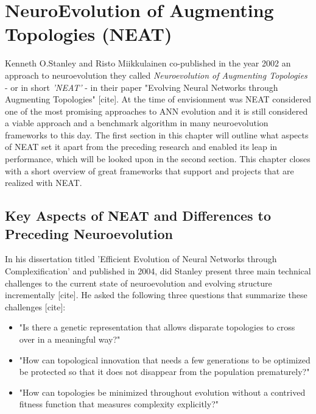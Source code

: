 \documentclass[journal, a4paper]{IEEEtran}
\begin{document}

\section{NeuroEvolution of Augmenting Topologies (NEAT)} \label{sec:neat}

Kenneth O.Stanley and Risto Miikkulainen co-published in the year 2002 an approach to neuroevolution they called \textit{Neuroevolution of Augmenting Topologies} - or in short \textit{'NEAT'} - in their paper "Evolving Neural Networks through Augmenting Topologies" [cite]. At the time of envisionment was NEAT considered one of the most promising approaches to ANN evolution and it is still considered a viable approach and a benchmark algorithm in many neuroevolution frameworks to this day. The first section in this chapter will outline what aspects of NEAT set it apart from the preceding research and enabled its leap in performance, which will be looked upon in the second section. This chapter closes with a short overview of great frameworks that support and projects that are realized with NEAT.



\subsection{Key Aspects of NEAT and Differences to Preceding Neuroevolution}

In his dissertation titled 'Efficient Evolution of Neural Networks through Complexification' and published in 2004, did Stanley present three main technical challenges to the current state of neuroevolution and evolving structure incrementally [cite]. He asked the following three questions that summarize these challenges [cite]:

\begin{itemize}
    \item "Is there a genetic representation that allows disparate topologies to cross over in a meaningful way?"
    \item "How can topological innovation that needs a few generations to be optimized be protected so that it does not disappear from the population prematurely?"
    \item "How can topologies be minimized throughout evolution without a contrived fitness function that measures complexity explicitly?"
\end{itemize}
\end{document}
